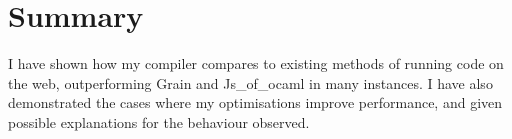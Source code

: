 \section{Summary}
I have shown how my compiler compares to existing methods of running code on the web, outperforming Grain and Js\_of\_ocaml in many instances. I have also demonstrated the cases where my optimisations improve performance, and given possible explanations for the behaviour observed.












